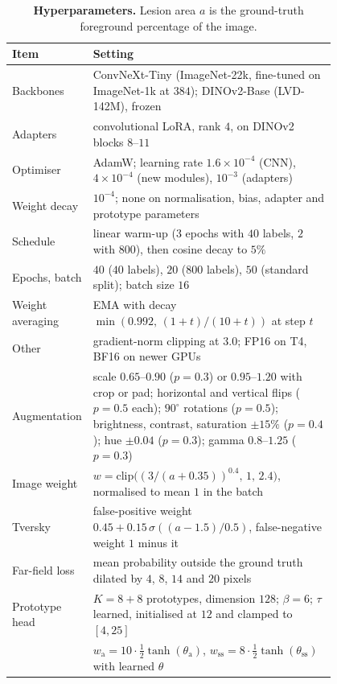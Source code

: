 \documentclass[10pt,twocolumn]{article}
\begin{document}
\begin{table}[h]
  \centering
  \caption{\textbf{Hyperparameters.} Lesion area $a$ is the ground-truth foreground percentage of the image.}
  \label{tab:impl}
  \small
  \begin{tabular}{@{}l p{0.8\linewidth}@{}}
    \toprule
    \textbf{Item} & \textbf{Setting} \\
    \midrule
    Backbones & ConvNeXt-Tiny (ImageNet-22k, fine-tuned on ImageNet-1k at $384$); DINOv2-Base (LVD-142M), frozen \\
    Adapters & convolutional LoRA, rank $4$, on DINOv2 blocks $8$--$11$ \\
    Optimiser & AdamW; learning rate $1.6\times10^{-4}$ (CNN), $4\times10^{-4}$ (new modules), $10^{-3}$ (adapters) \\
    Weight decay & $10^{-4}$; none on normalisation, bias, adapter and prototype parameters \\
    Schedule & linear warm-up ($3$ epochs with $40$ labels, $2$ with $800$), then cosine decay to $5\%$ \\
    Epochs, batch & $40$ ($40$ labels), $20$ ($800$ labels), $50$ (standard split); batch size $16$ \\
    Weight averaging & EMA with decay $\min(0.992,\,(1+t)/(10+t))$ at step $t$ \\
    Other & gradient-norm clipping at $3.0$; FP16 on T4, BF16 on newer GPUs \\
    Augmentation & scale $0.65$--$0.90$ ($p=0.3$) or $0.95$--$1.20$ with crop or pad; horizontal and vertical flips ($p=0.5$ each); $90^\circ$ rotations ($p=0.5$); brightness, contrast, saturation $\pm15\%$ ($p=0.4$); hue $\pm0.04$ ($p=0.3$); gamma $0.8$--$1.25$ ($p=0.3$) \\
    \midrule
    Image weight & $w=\mathrm{clip}\bigl((3/(a+0.35))^{0.4},\,1,\,2.4\bigr)$, normalised to mean $1$ in the batch \\
    Tversky & false-positive weight $0.45+0.15\,\sigma((a-1.5)/0.5)$, false-negative weight $1$ minus it \\
    Far-field loss & mean probability outside the ground truth dilated by $4$, $8$, $14$ and $20$ pixels \\
    Prototype head & $K=8+8$ prototypes, dimension $128$; $\beta=6$; $\tau$ learned, initialised at $12$ and clamped to $[4,25]$ \\
    & $w_{\text{a}}=10\cdot\tfrac12\tanh(\theta_{\text{a}})$, $w_{\text{ss}}=8\cdot\tfrac12\tanh(\theta_{\text{ss}})$ with learned $\theta$ \\

\end{tabular}
\end{table}
\end{document}
